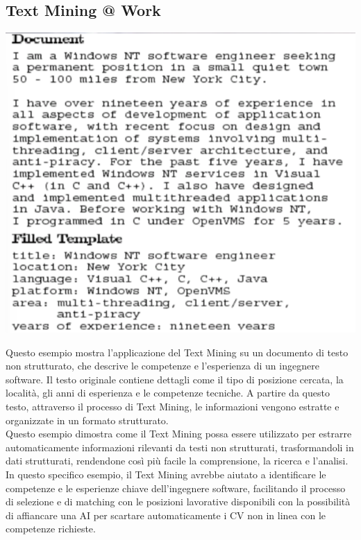 \documentclass{report}
\begin{document}
	\subsection{Text Mining @ Work}
	\begin{center}
		\includegraphics[scale=0.6]{assets/textminingwork.png}
	\end{center}
	Questo esempio mostra l'applicazione del Text Mining su un documento di testo non strutturato, che descrive le competenze e l'esperienza di un ingegnere software. Il testo originale contiene dettagli come il tipo di posizione cercata, la località, gli anni di esperienza e le competenze tecniche. A partire da questo testo, attraverso il processo di Text Mining, le informazioni vengono estratte e organizzate in un formato strutturato.
	\vspace{\baselineskip}\\
	Questo esempio dimostra come il Text Mining possa essere utilizzato per estrarre automaticamente informazioni rilevanti da testi non strutturati, trasformandoli in dati strutturati, rendendone così più facile la comprensione, la ricerca e l'analisi.
	\vspace{\baselineskip}\\
	In questo specifico esempio, il Text Mining avrebbe aiutato a identificare le competenze e le esperienze chiave dell'ingegnere software, facilitando il processo di selezione e di matching con le posizioni lavorative disponibili con la possibilità di affiancare una AI per scartare automaticamente i CV non in linea con le competenze richieste.
\end{document}
